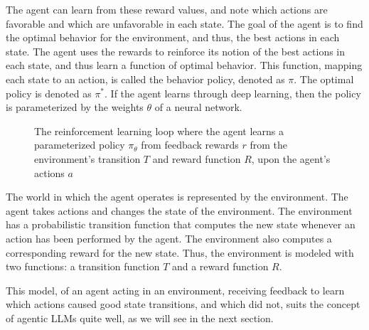 The agent can learn from these reward values, and note which actions
are favorable and which are unfavorable in each state. The goal of the agent is to find the optimal behavior for the environment, and thus, the best actions in each state. The agent uses the rewards to reinforce its notion of the best actions in each state, and thus learn a  function of optimal behavior. This function, mapping each state to an  action, is called the
behavior policy, denoted as $\pi$.  The optimal policy is denoted as
$\pi^*$. 
If the agent learns
through deep learning, then the policy is parameterized by the weights $\theta$
of a neural network. 

\begin{figure}
  \begin{center}
    
    \caption{The  reinforcement learning loop where the agent learns a parameterized policy $\pi_\theta$ from feedback rewards $r$ from the environment's transition $T$ and reward function $R$, upon the agent's actions $a$ \citep{sutton2018reinforcement}}\label{fig:rl}
  \end{center}
\end{figure}

The world in which the agent operates is represented by the environment. The agent  takes actions and  changes the state of the environment. The environment has a probabilistic transition function that  computes the new
state whenever an action has been performed by the agent. The environment also computes a corresponding reward for the new
state. Thus, the environment is modeled with two functions: a
transition function $T$ and a reward function $R$. %

This model, of an agent acting in an environment, receiving feedback
to learn which actions caused good state transitions, and which did
not, suits the concept of agentic LLMs quite well, as we will see in the next section. 


